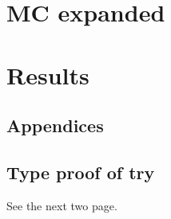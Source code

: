\part{MC expanded}\label{part:mcexpanded}
\cleardoublepage

\cleardoublepage



\cleardoublepage




\cleardoublepage
\part{Results}
\cleardoublepage

\cleardoublepage



\cleardoublepage


\begin{appendices}
   \part{Appendices}
   \cleardoublepage

   \chapter{Type proof of try}
   See the next two page.
   
   


\end{appendices}


